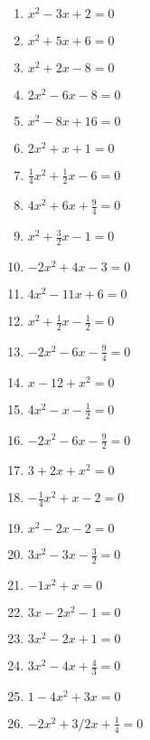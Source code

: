 \begin{Exercise}[title={Löse die folgenden Gleichungen}, label=mitternachtA1]\\
	\begin{minipage}{\textwidth}
		\begin{minipage}{0.49\textwidth}
			\begin{enumerate}[label=\alph*)]
				\item \(x^2-3x+2=0\)
				\item \(x^2+5x+6=0\)
				\item \(x^2+2x-8=0\)
				\item \(2x^2-6x-8=0\)
				\item \(x^2-8x+16=0\)
				\item \(2x^2+x+1=0\)
				\item \(\frac{1}{4}x^2+\frac{1}{2}x-6=0\)
				\item \(4x^2+6x+\frac{9}{4}=0\)
				\item \(x^2+\frac{3}{2}x-1=0\)
				\item \(-2x^2+4x-3=0\)
				\item \(4x^2-11x+6=0\)
				\item \(x^2+\frac{1}{2}x-\frac{1}{2}=0\)
				\item \(-2x^2-6x-\frac{9}{4}=0\)
			\end{enumerate}
		\end{minipage}
		\begin{minipage}{0.49\textwidth}
			\begin{enumerate}[label=\alph*)]
				\setcounter{enumi}{13}
				\item \(x-12+x^2=0\)
				\item \(4x^2-x-\frac{1}{2}=0\)
				\item \(-2x^2-6x-\frac{9}{2}=0\)
				\item \(3+2x+x^2=0\)
				\item \(-\frac{1}{4}x^2+x-2=0\)
				\item \(x^2-2x-2=0\)
				\item \(3x^2-3x-\frac{3}{2}=0\)
				\item \(-1x^2+x=0\)
				\item \(3x-2x^2-1=0\)
				\item \(3x^2-2x+1=0\)
				\item \(3x^2-4x+\frac{4}{3}=0\)
				\item \(1-4x^2+3x=0\)
				\item \(-2x^2+3/2x+\frac{1}{4}=0\)
			\end{enumerate}
		\end{minipage}
	\end{minipage}
\end{Exercise}
